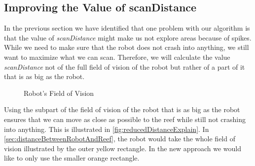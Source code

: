 \documentclass[twoside, 12pt]{article}
\begin{document}
\begin{figure}
\vspace{-50pt}
\end{figure}

\subsection{Improving the Value of scanDistance}
\label{sec:improvingValueOfScanDistance
}

In the previous section we have identified that one problem with our algorithm is that the value of \textit{scanDistance} might make us not explore areas because of spikes. While we need to make sure that the robot does not crash into anything, we still want to maximize what we can scan. Therefore, we will calculate the value \textit{scanDistance} not of the full field of vision of the robot but rather of a part of it that is as big as the robot.\\

\begin{figure}
\vspace{-28pt}
  \begin{center}
  \end{center}
\vspace{-20pt}
  \caption{Robot's Field of Vision}
  \label{fig:reducedDistanceExplain}
\vspace{20pt}
\end{figure}

Using the subpart of the field of vision of the robot that is as big as the robot ensures that we can move as close as possible to the reef while still not crashing into anything. This is illustrated in \autoref{fig:reducedDistanceExplain}. In \autoref{sec:distanceBetweenRobotAndReef}, the robot would take the whole field of vision illustrated by the outer yellow rectangle. In the new approach we would like to only use the smaller orange rectangle.\\
\end{document}
